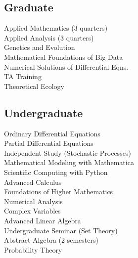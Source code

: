 \documentclass[letterpaper]{deedy-resume} %
\begin{document}
\begin{minipage}[t]{0.33\textwidth}
\subsection{Graduate}

Applied Mathematics (3 quarters) \\
Applied Analysis (3 quarters) \\
Genetics and Evolution \\
Mathematical Foundations of Big Data \\
Numerical Solutions of Differential Eqns. \\
TA Training \\
Theoretical Ecology \\

\vspace{7pt} %


\subsection{Undergraduate}

Ordinary Differential Equations \\
Partial Differential Equations \\
Independent Study (Stochastic Processes) \\
Mathematical Modeling with Mathematica \\
Scientific Computing with Python \\
Advanced Calculus \\
Foundations of Higher Mathematics \\
Numerical Analysis \\
Complex Variables \\
Advanced Linear Algebra \\
Undergraduate Seminar (Set Theory) \\
Abstract Algebra (2 semesters)\\
Probability Theory \\

\vspace{7pt} %



\end{minipage}
\end{document}
